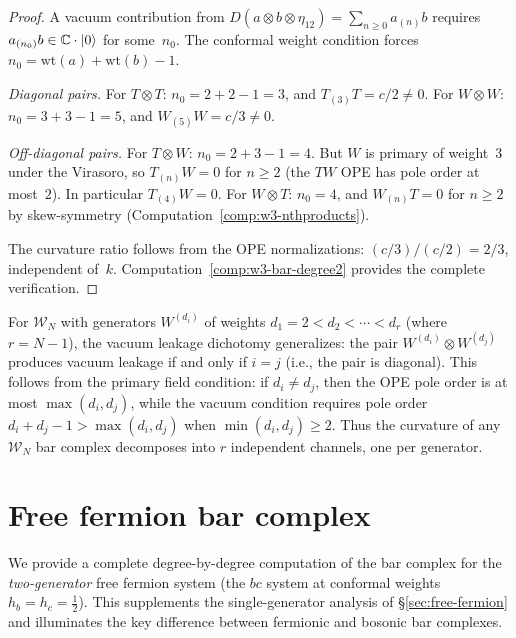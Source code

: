 \begin{proof}
A vacuum contribution from $D(a \otimes b \otimes \eta_{12})
= \sum_{n \geq 0} a_{(n)}b$ requires $a_{(n_0)}b \in \mathbb{C} \cdot |0\rangle$
for some~$n_0$.  The conformal weight condition forces
$n_0 = \mathrm{wt}(a) + \mathrm{wt}(b) - 1$.

\emph{Diagonal pairs.}
For $T \otimes T$: $n_0 = 2 + 2 - 1 = 3$, and $T_{(3)}T = c/2 \neq 0$.
For $W \otimes W$: $n_0 = 3 + 3 - 1 = 5$, and $W_{(5)}W = c/3 \neq 0$.

\emph{Off-diagonal pairs.}
For $T \otimes W$: $n_0 = 2 + 3 - 1 = 4$.  But $W$ is primary of
weight~$3$ under the Virasoro, so $T_{(n)}W = 0$ for $n \geq 2$
(the $TW$ OPE has pole order at most~$2$).  In particular $T_{(4)}W = 0$.
For $W \otimes T$: $n_0 = 4$, and $W_{(n)}T = 0$ for $n \geq 2$ by
skew-symmetry (Computation~\ref{comp:w3-nthproducts}).

The curvature ratio follows from the OPE normalizations:
$(c/3)/(c/2) = 2/3$, independent of~$k$.
Computation~\ref{comp:w3-bar-degree2} provides the complete verification.
\end{proof}

\begin{remark}\label{rem:wn-vacuum-channels}
For $\mathcal{W}_N$ with generators $W^{(d_i)}$ of weights $d_1 = 2 < d_2 < \cdots < d_r$
(where $r = N-1$), the vacuum leakage dichotomy generalizes: the pair
$W^{(d_i)} \otimes W^{(d_j)}$ produces vacuum leakage if and only if
$i = j$ (i.e., the pair is diagonal).
This follows from the primary field condition: if $d_i \neq d_j$,
then the OPE pole order is at most $\max(d_i, d_j)$, while the vacuum
condition requires pole order $d_i + d_j - 1 > \max(d_i, d_j)$ when
$\min(d_i, d_j) \geq 2$.  Thus the curvature of any $\mathcal{W}_N$
bar complex decomposes into $r$ independent channels, one per generator.
\end{remark}



\section{Free fermion bar complex}
\label{sec:fermion-bar-details}

We provide a complete degree-by-degree computation of the bar complex
for the \emph{two-generator} free fermion system (the $bc$ system
at conformal weights $h_b = h_c = \tfrac{1}{2}$).
This supplements the single-generator analysis of
\S\ref{sec:free-fermion} and illuminates the key difference between
fermionic and bosonic bar complexes.

